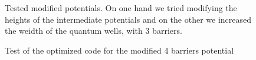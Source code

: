 \documentclass[12pt,a4paper,onecolumn]{article}
\theoremstyle{definition}
\theoremstyle{plain}
\begin{document}
\begin{figure}[H]
\centering
	\caption{Tested modified potentials. On one hand we tried modifying the heights of the intermediate potentials and on the other we increased the weidth of the quantum wells, with 3 barriers.} 
	\label{fig:modified_potentials}
\end{figure}

\begin{figure}[H]
\centering
	\caption{Test of the optimized code for the modified 4 barriers potential} 
	\label{fig:modified_1}
\end{figure}
\end{document}
